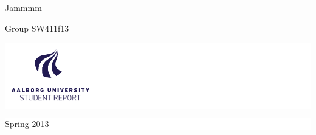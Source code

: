 %
%
%
%
	\thispagestyle{empty}

	\vspace*{\fill}

	\noindent \colorbox{aaublue}{
		\parbox{\textwidth}{%
			\color{white}%
			\begin{center}
				\Huge{{\selectfont Jammmm}} %
			\end{center}
			\begin{center}
			\Large{\textsf{Group SW411f13}} %
			\end{center}
		}}

	\vfill

	\noindent \colorbox{white}{
		\begin{minipage}[b]{6.5cm}
		\begin{center}
			\includegraphics[width=150px]{billeder/aau_new_logo}
			\end{center}
			\vspace*{-20px}
		\end{minipage}
	} 
	\hfill  
	\colorbox{white}{ 
		\begin{minipage}[b]{3.5cm}	 
			\flushright
			{\large Spring 2013} \\
		\end{minipage}
	}

\clearpage
